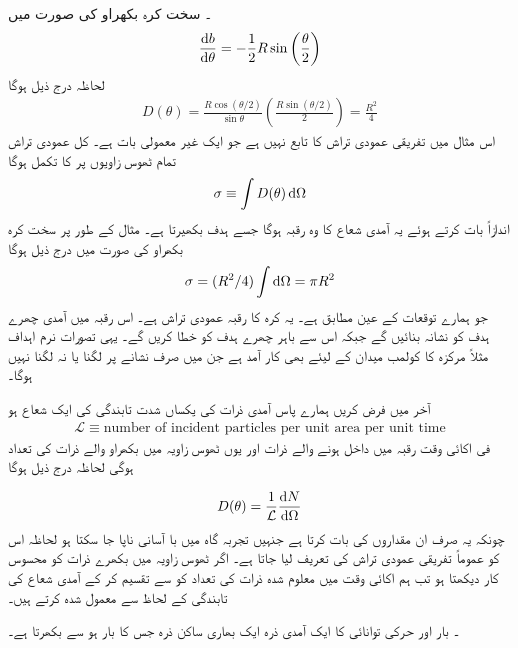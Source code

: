 ۔ سخت کرہ بکھراو  کی صورت میں 
\begin{align}
	\frac{\dif b}{\dif\theta}=-\frac{1}{2}R\sin\left(\frac{\theta}{2}\right)
\end{align}
لحاظہ درج ذیل ہوگا 
\begin{align}
	D(\theta) = \frac{R\cos(\theta/2)}{\sin\theta}\left(\frac{R\sin(\theta/2)}{2}\right) = \frac{R^2}{4}
\end{align}
اس مثال میں تفریقی عمودی تراش  کا تابع نہیں ہے جو ایک غیر معمولی بات ہے۔
کل عمودی تراش تمام ٹھوس زاویوں پر  کا تکمل ہوگا
\begin{align}
	\sigma\equiv\int D(\theta)\dif\Omega	
\end{align}
اندازاً بات کرتے ہوئے یہ آمدی شعاع کا وہ رقبہ ہوگا جسے ہدف بکھیرتا ہے۔ مثال کے طور پر سخت کرہ بکھراو کی صورت میں درج ذیل ہوگا
\begin{align}
	\sigma = (R^2/4)\int \dif\Omega = \pi R^2
\end{align}
جو ہمارے توقعات کے عین مطابق ہے۔ یہ کرہ کا رقبہ عمودی تراش ہے۔ اس رقبہ میں آمدی چھرے ہدف کو نشانہ بنائیں گے جبکہ اس سے باہر چھرے ہدف کو خطا کریں گے۔ یہی تصورات نرم اہداف مثلاً مرکزہ کا کولمب میدان کے لیئے بھی کار آمد ہے جن میں صرف نشانے پر لگنا یا نہ لگنا نہیں ہوگا۔

آخر میں فرض کریں ہمارے پاس آمدی ذرات کی یکساں شدت تابندگی کی ایک شعاع ہو 
\begin{align}
	\mathcal{L}\equiv\text{number of incident particles per unit area per unit time}
\end{align}
فی اکائی وقت رقبہ  میں داخل ہونے والے ذرات اور یوں ٹھوس زاویہ  میں بکھراو والے ذرات کی تعداد   ہوگی لحاظہ درج ذیل ہوگا 

\begin{align}
	D(\theta) = \frac{1}{\mathcal{L}}\frac{\dif N}{\dif\Omega}
\end{align}
چونکہ یہ صرف ان مقداروں کی بات کرتا ہے جنہیں تجربہ گاہ میں با آسانی ناپا جا سکتا ہو لحاظہ اس کو عموماً تفریقی عمودی تراش کی تعریف لیا جاتا ہے۔ اگر ٹھوس زاویہ  میں بکھرے ذرات کو محسوس کار دیکھتا ہو تب ہم اکائی وقت میں معلوم شدہ ذرات کی تعداد کو  سے تقسیم کر کے آمدی شعاع کی تابندگی کے لحاظ سے معمول شدہ کرتے ہیں۔

۔ بار  اور حرکی توانائی  کا ایک آمدی ذرہ ایک بھاری ساکن ذرہ جس کا بار  ہو 	سے بکھرتا ہے۔

